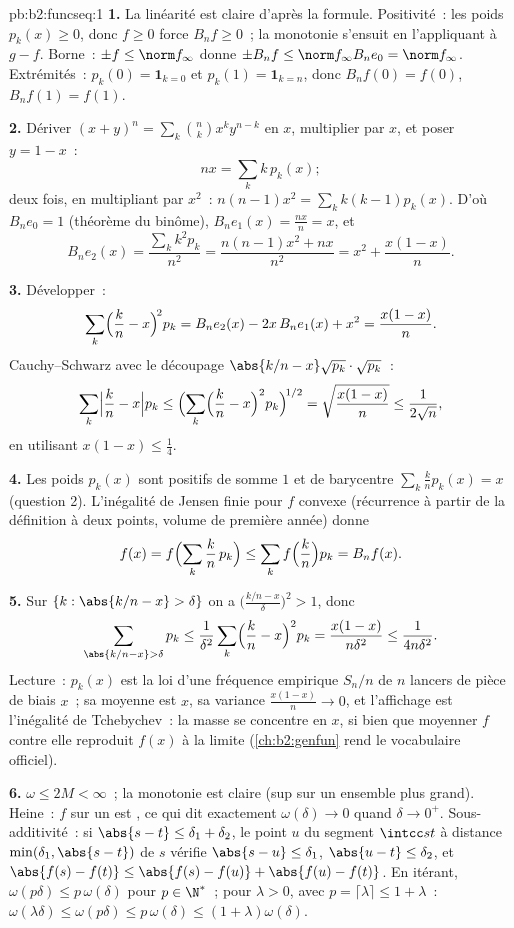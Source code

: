 \begin{solution}{pb:b2:funcseq:1}
\textbf{1.} La linéarité est claire d'après la formule. Positivité~:
les poids $p_k(x) \geq 0$, donc $f \geq 0$ force $B_nf \geq
0$~; la monotonie s'ensuit en l'appliquant à $g - f$. Borne~: $\pm f \leq
\norm f_\infty$ donne $\pm B_nf \leq \norm f_\infty B_ne_0 =
\norm f_\infty$. Extrémités~: $p_k(0) = \mathbf 1_{k=0}$ et
$p_k(1) = \mathbf 1_{k=n}$, donc $B_nf(0) = f(0)$, $B_nf(1) =
f(1)$.

\textbf{2.} Dériver $(x+y)^n = \sum_k\binom nk x^ky^{n-k}$
en $x$, multiplier par $x$, et poser $y = 1 - x$~:
\[
nx = \sum_k k\,p_k(x) ;
\]
deux fois, en multipliant par $x^2$~: $n(n-1)x^2 = \sum_k k(k-1)p_k(x)$.
D'où $B_ne_0 = 1$ (théorème du binôme), $B_ne_1(x) =
\frac{nx}{n} = x$, et
\[
B_ne_2(x) = \frac{\sum_k k^2p_k}{n^2}
= \frac{n(n-1)x^2 + nx}{n^2}
= x^2 + \frac{x(1-x)}{n} .
\]

\textbf{3.} Développer~:
\[
\sum_k\Bigl(\frac kn - x\Bigr)^{\!2} p_k
= B_ne_2(x) - 2x\,B_ne_1(x) + x^2
= \frac{x(1-x)}{n} .
\]
Cauchy--Schwarz avec le découpage $\abs{k/n - x}\sqrt{p_k}
\cdot \sqrt{p_k}$~:
\[
\sum_k\Bigl|\frac kn - x\Bigr| p_k
\leq \Bigl(\sum_k\Bigl(\frac kn - x\Bigr)^2
p_k\Bigr)^{\!1/2}
= \sqrt{\frac{x(1-x)}{n}} \leq \frac{1}{2\sqrt n},
\]
en utilisant $x(1-x) \leq \frac14$.

\textbf{4.} Les poids $p_k(x)$ sont positifs de somme $1$
et de barycentre $\sum_k \frac kn p_k(x) = x$ (question 2). L'inégalité
de Jensen finie pour $f$ convexe (récurrence à partir de la définition
à deux points, volume de première année) donne
\[
f(x) = f\Bigl(\sum_k \frac kn\,p_k\Bigr)
\leq \sum_k f\Bigl(\frac kn\Bigr)p_k = B_nf(x) .
\]

\textbf{5.} Sur $\{k : \abs{k/n - x} > \delta\}$ on a
$\bigl(\frac{k/n - x}{\delta}\bigr)^2 > 1$, donc
\[
\sum_{\abs{k/n-x}>\delta} p_k
\leq \frac{1}{\delta^2}\sum_k\Bigl(\frac kn -
x\Bigr)^2p_k
= \frac{x(1-x)}{n\delta^2} \leq \frac{1}{4n\delta^2} .
\]
Lecture~: $p_k(x)$ est la loi d'une fréquence empirique $S_n/n$ de
$n$ lancers de pièce de biais $x$~; sa moyenne est $x$, sa variance
$\frac{x(1-x)}n \to 0$, et l'affichage est l'inégalité de Tchebychev~:
la masse se concentre en $x$, si bien que moyenner $f$
contre elle reproduit $f(x)$ à la limite
(\cref{ch:b2:genfun} rend le vocabulaire officiel).

\textbf{6.} $\omega \leq 2M < \infty$~; la monotonie est claire
(sup sur un ensemble plus grand). Heine~: $f$  sur un 
est  , ce qui dit exactement $\omega(\delta) \to 0$
quand $\delta \to 0^+$. Sous-additivité~: si $\abs{s - t} \leq
\delta_1 + \delta_2$, le point $u$ du segment $\intcc st$
à distance $\min(\delta_1, \abs{s-t})$ de $s$ vérifie
$\abs{s-u} \leq \delta_1$, $\abs{u-t} \leq \delta_2$, et
$\abs{f(s)-f(t)} \leq \abs{f(s)-f(u)} + \abs{f(u)-f(t)}$.
En itérant, $\omega(p\delta) \leq p\,\omega(\delta)$ pour $p \in
\N^*$~; pour $\lambda > 0$, avec $p = \lceil\lambda\rceil \leq 1
+ \lambda$~: $\omega(\lambda\delta) \leq \omega(p\delta) \leq
p\,\omega(\delta) \leq (1+\lambda)\omega(\delta)$.


\end{solution}
